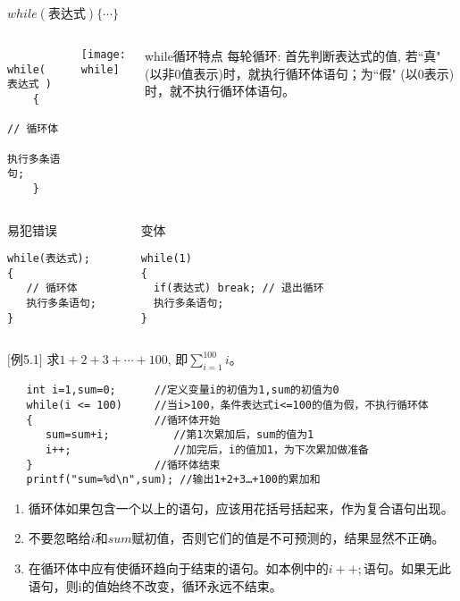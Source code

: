 \begin{frame}{$while(\text{表达式})\{ \cdots\}$}
\begin{columns}
	\begin{lstlisting} 
    while( 表达式 )   
    {
       // 循环体
       执行多条语句;  
    }   
    \end{lstlisting}
	\texttt{[image: while]}
	\small
	\begin{block}{while循环特点}
		\small
		每轮循环: 首先判断表达式的值, 若``真" (以非0值表示)时，就执行循环体语句；为``假" (以0表示)时，就不执行循环体语句。
	\end{block}
\end{columns}
\begin{columns}
\begin{block}{易犯错误}
\begin{lstlisting} 
while(表达式); 
{
   // 循环体
   执行多条语句;    
}
\end{lstlisting}
\end{block}
\begin{block}{变体}
\begin{lstlisting} 
while(1)  
{
  if(表达式) break; // 退出循环
  执行多条语句;    
}
\end{lstlisting}
\end{block}
\end{columns}
\end{frame}

\begin{frame}
$[$例5.1$]$ 求$1+2+3+\cdots+100$, 即$\sum\limits_{i=1}^{100}i$。
\begin{lstlisting}
   int i=1,sum=0;      //定义变量i的初值为1,sum的初值为0  
   while(i <= 100)     //当i>100，条件表达式i<=100的值为假，不执行循环体
   {                   //循环体开始
      sum=sum+i;          //第1次累加后，sum的值为1
      i++;                //加完后，i的值加1，为下次累加做准备
   }                   //循环体结束
   printf("sum=%d\n",sum); //输出1+2+3…+100的累加和                
\end{lstlisting}
\begin{enumerate}
	\setlength{\itemsep}{.2cm}
	\item 循环体如果包含一个以上的语句，应该用花括号括起来，作为复合语句出现。
	\item 不要忽略给$i$和$sum$赋初值，否则它们的值是不可预测的，结果显然不正确。
	\item 在循环体中应有使循环趋向于结束的语句。如本例中的$i++;$语句。如果无此语句，则i的值始终不改变，循环永远不结束。
\end{enumerate}
\end{frame}

